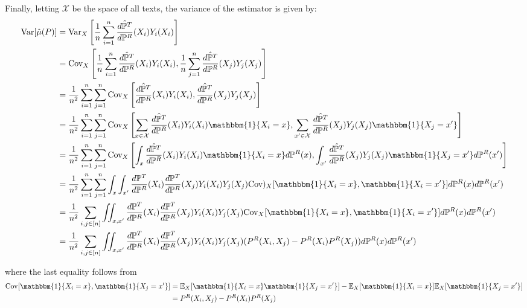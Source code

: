 \documentclass{article}
\begin{document}
Finally, letting $\mathcal{X}$ be the space of all texts, the variance of the estimator is given by:
\begin{align*}
    \text{Var}[\hat{\mu}(P)] &= \text{Var}_X\left[\frac{1}{n} \sum_{i=1}^n \frac{\hat{d \mathbb{P}^T}}{d \mathbb{P}^R}(X_i)Y_i(X_i)\right] \\
    &= \text{Cov}_X\left[\frac{1}{n} \sum_{i=1}^n \frac{\hat{d \mathbb{P}^T}}{d \mathbb{P}^R}(X_i)Y_i(X_i), \frac{1}{n} \sum_{j=1}^n \frac{\hat{d \mathbb{P}^T}}{d \mathbb{P}^R}(X_j)Y_j(X_j)\right] \\
    &= \frac{1}{n^2}\sum_{i=1}^n \sum_{j=1}^n \text{Cov}_X\left[\frac{\hat{d \mathbb{P}^T}}{d \mathbb{P}^R}(X_i)Y_i(X_i), \frac{\hat{d \mathbb{P}^T}}{d \mathbb{P}^R}(X_j)Y_j(X_j)\right] \\
    &= \frac{1}{n^2}\sum_{i=1}^n \sum_{j=1}^n \text{Cov}_X\left[\sum_{x \in \mathcal{X}}\frac{\hat{d \mathbb{P}^T}}{d \mathbb{P}^R}(X_i)Y_i(X_i)\mathbbm{1}\{X_i = x\}, \sum_{x' \in \mathcal{X}}\frac{\hat{d \mathbb{P}^T}}{d \mathbb{P}^R}(X_j)Y_j(X_j)\mathbbm{1}\{X_j=x'\}\right] \\
    &= \frac{1}{n^2}\sum_{i=1}^n \sum_{j=1}^n \text{Cov}_X\left[\int_x\frac{\hat{d \mathbb{P}^T}}{d \mathbb{P}^R}(X_i)Y_i(X_i)\mathbbm{1}\{X_i = x\}d\mathbb{P}^R(x), \int_{x'}\frac{\hat{d \mathbb{P}^T}}{d \mathbb{P}^R}(X_j)Y_j(X_j)\mathbbm{1}\{X_j=x'\}d\mathbb{P}^R(x')\right] \\
    &= \frac{1}{n^2} \sum_{i=1}^n \sum_{j=1}^n \int_x \int_{x'} \frac{d \mathbb{P}^T}{d \mathbb{P}^R}(X_i)\frac{d \mathbb{P}^T}{d \mathbb{P}^R}(X_j)Y_i(X_i)Y_j(X_j) \text{Cov})_X[\mathbbm{1}\{X_i=x\}, \mathbbm{1}\{X_i=x'\}]d\mathbb{P}^R(x)d\mathbb{P}^R(x') \\
    &= \frac{1}{n^2} \sum_{i,j \in [n]} \iint_{x, x'} \frac{d \mathbb{P}^T}{d \mathbb{P}^R}(X_i)\frac{d \mathbb{P}^T}{d \mathbb{P}^R}(X_j)Y_i(X_i)Y_j(X_j) \text{Cov}_X[\mathbbm{1}\{X_i=x\}, \mathbbm{1}\{X_i=x'\}]d\mathbb{P}^R(x)d\mathbb{P}^R(x') \\
    &= \frac{1}{n^2} \sum_{i,j \in [n]} \iint_{x, x'} \frac{d \mathbb{P}^T}{d \mathbb{P}^R}(X_i)\frac{d \mathbb{P}^T}{d \mathbb{P}^R}(X_j)Y_i(X_i)Y_j(X_j) (P^R(X_i,X_j) - P^R(X_i)P^R(X_j))d\mathbb{P}^R(x)d\mathbb{P}^R(x')
\end{align*}

where the last equality follows from
\begin{align*}
    \text{Cov}[\mathbbm{1}\{X_i=x\},\mathbbm{1}\{X_j=x'\}] &=\mathbb{E}_X[\mathbbm{1}\{X_i=x\}\mathbbm{1}\{X_j=x'\}] - \mathbb{E}_X[\mathbbm{1}\{X_i=x\}]\mathbb{E}_X[\mathbbm{1}\{X_j=x'\}] \\
    &= P^R(X_i,X_j) - P^R(X_i)P^R(X_j)
\end{align*}
\end{document}
